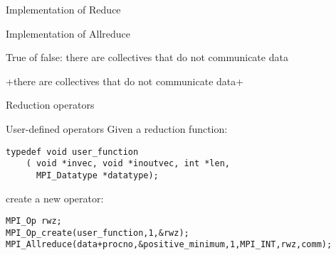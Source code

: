 \begin{numberedframe}{Implementation of Reduce}
  \footnotesize
  
\end{numberedframe}

\begin{numberedframe}{Implementation of Allreduce}
  \footnotesize
  
\end{numberedframe}

\begin{reviewframe}
  True of false: there are collectives that do not communicate data

  \slackpollTF+there are collectives that do not communicate data+
\end{reviewframe}

 {Reduction operators}

\begin{numberedframe}{User-defined operators}
\lstset{language=C}
Given a reduction function:
\begin{lstlisting}
typedef void user_function
    ( void *invec, void *inoutvec, int *len, 
      MPI_Datatype *datatype); 
\end{lstlisting}  
create a new operator:
\begin{lstlisting}
MPI_Op rwz;
MPI_Op_create(user_function,1,&rwz);
MPI_Allreduce(data+procno,&positive_minimum,1,MPI_INT,rwz,comm);
\end{lstlisting}
\end{numberedframe}

\begin{exerciseframe}[onenorm]
  
\end{exerciseframe}

\endinput

\begin{numberedframe}{}
\begin{lstlisting}
  
\end{lstlisting}
\end{numberedframe}

\begin{numberedframe}{}
\begin{lstlisting}
  
\end{lstlisting}
\end{numberedframe}

\begin{numberedframe}{}
\begin{verbatim}
  
\end{verbatim}
\end{numberedframe}

